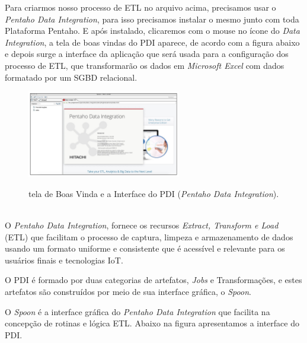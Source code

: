 Para criarmos nosso processo de ETL no arquivo acima, precisamos usar o \textit{Pentaho Data Integration}, para isso precisamos instalar o mesmo junto com toda Plataforma Pentaho. E ap\'{o}s instalado,  clicaremos com o mouse no \'{i}cone do \textit{Data Integration}, a tela de boas vindas do PDI aparece, de acordo com a figura abaixo e depois surge a interface da aplica\c{c}\~{a}o que ser\'{a} usada para a configura\c{c}\~{a}o dos processo de ETL, que transformar\~{a}o os dados em \textit{Microsoft Excel} com dados formatado por um SGBD relacional.

\begin{figure}[H]
	\vspace*{0,2cm}
    \centering
    \caption{tela de Boas Vinda e a Interface do PDI (\textit{Pentaho Data Integration}).}
    \includegraphics[width=0.6\textwidth]{./04-figuras/figura-pentaho-pdi}
    \label{fig:ilustfigpentaho-pdi}
\end{figure}
\vspace*{-0,9cm}
{\raggedright {}} \\

O \textit{Pentaho Data Integration}, fornece os recursos \textit{Extract, Transform e Load} (ETL) que facilitam o processo de captura, limpeza e armazenamento de dados usando um formato uniforme e consistente que \'{e} acess\'{i}vel e relevante para os usu\'{a}rios finais e tecnologias IoT. \cite{pentaho-pdi-hitachi-vantara}

O PDI \'{e} formado por duas categorias de artefatos, \textit{Jobs} e Transforma\c{c}\~{o}es, e estes artefatos s\~{a}o constru\'{i}dos por meio de sua interface gr\'{a}fica, o \textit{Spoon}. 

O \textit{Spoon} \'{e} a interface gr\'{a}fica do \textit{Pentaho Data Integration} que facilita na concep\c{c}\~{a}o de rotinas e l\'ogica ETL. Abaixo na figura apresentamos a interface do PDI.

